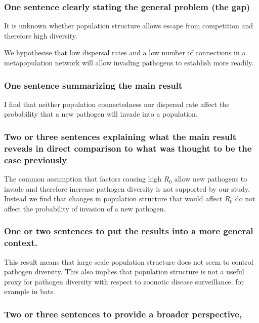 \subsubsection{One sentence clearly stating the general problem (the gap)}
It is unknown whether population structure allows escape from competition and therefore high diversity.

We hypothesise that low dispersal rates and a low number of connections in a metapopulation network will allow invading pathogens to establish more readily. 

\subsubsection{One sentence summarizing the main result}
I find that neither population connectedness nor dispersal rate affect the probability that a new pathogen will invade into a population.

\subsubsection{Two or three sentences explaining what the main result reveals in direct comparison to what was thought to be the case previously}
The common assumption that factors causing high $R_0$ allow new pathogens to invade and therefore increase pathogen diversity is not supported by our study.
Instead we find that changes in population structure that would affect $R_0$ do not affect the probability of invasion of a new pathogen.


\subsubsection{One or two sentences to put the results into a more general context.}
This result means that large scale population structure does not seem to control pathogen diversity.
This also implies that population structure is not a useful proxy for pathogen diversity with respect to zoonotic disease surveillance, for example in bats.


\subsubsection{Two or three sentences to provide a broader perspective, }





